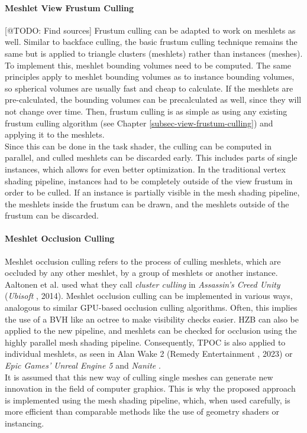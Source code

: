 \paragraph*{Meshlet View Frustum Culling} \label{subsubsec-meshlet-view-frustum-culling}

[@TODO: Find sources]
Frustum culling can be adapted to work on meshlets as well. Similar to backface culling, the basic frustum culling 
technique remains the same but is applied to triangle clusters (meshlets) rather than instances (meshes). To 
implement this, meshlet bounding volumes need to be computed. The same principles apply to meshlet bounding volumes 
as to instance bounding volumes, so spherical volumes are usually fast and cheap to calculate. If the meshlets are 
pre-calculated, the bounding volumes can be precalculated as well, since they will not change over time. Then, frustum 
culling is as simple as using any existing frustum culling algorithm (see Chapter \ref{subsec-view-frustum-culling}) and 
applying it to the meshlets. \\

\noindent
Since this can be done in the task shader, the culling can be computed in parallel, and culled meshlets can 
be discarded early. This includes parts of single instances, which allows for even better optimization. In 
the traditional vertex shading pipeline, instances had to be completely outside of the view frustum in order 
to be culled. If an instance is partially visible in the mesh shading pipeline, the meshlets inside the frustum 
can be drawn, and the meshlets outside of the frustum can be discarded.


\paragraph*{Meshlet Occlusion Culling} \label{subsubsec-meshlet-occlusion-culling}

Meshlet occlusion culling refers to the process of culling meshlets, which are occluded by any other meshlet, by a 
group of meshlets or another instance. Aaltonen et al. \cite{Aaltonen2015} used what they call \emph{cluster culling} 
in \emph{Assassin's Creed Unity} (\emph{Ubisoft} \cite{Ubisoft2014}, 2014). Meshlet occlusion culling can be 
implemented in various ways, analogous to similar \ac{GPU}-based occlusion culling algorithms. Often, this implies 
the use of a \ac{BVH} like an octree to make visibility checks easier. \ac{HZB} can also be applied to the new pipeline, 
and meshlets can be checked for occlusion using the highly parallel mesh shading pipeline. Consequently, \ac{TPOC} 
is also applied to individual meshlets, as seen in Alan Wake 2 (Remedy Entertainment \cite{Remedy2023}, 2023) or 
\emph{Epic Games'} \emph{Unreal Engine 5} and \emph{Nanite} \cite{Karis2021}.\\

\noindent
It is assumed that this new way of culling single meshes can generate new innovation in the field of computer graphics.
This is why the proposed approach is implemented using the mesh shading pipeline, which, when used carefully, is more 
efficient than comparable methods like the use of geometry shaders or instancing.